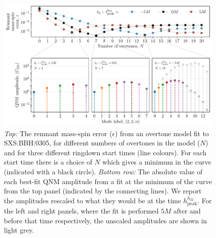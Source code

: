 \begin{figure}[t]
    \centering
    \includegraphics[width=0.9\columnwidth]{Figures/ModellingTheRingdownFromPrecessingBlackHoleBinaries/305_even_more_overtones.pdf}
    \caption[Remnant-property errors and mode amplitudes for different numbers of overtones fitted to SXS:BBH:0305]{ 
    \emph{Top:} The remnant mass-spin error ($\epsilon$) from an overtone model fit to SXS:BBH:0305, for different numbers of overtones in the model ($N$) and for three different ringdown start times (line colours). For each start time there is a choice of $N$ which gives a minimum in the curve (indicated with a black circle).
    \emph{Bottom row:} The absolute value of each best-fit QNM amplitude from a fit at the minimum of the curve from the top panel (indicated by the connecting lines). We report the amplitudes rescaled to what they would be at the time $h_\mathrm{peak}^{h_{22}}$. For the left and right panels, where the fit is performed $5M$ after and before that time respectively, the unscaled amplitudes are shown in light grey.
    }
    \label{305_even_more_overtones}
\end{figure}

